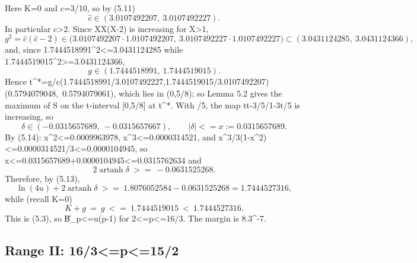 \documentclass[10pt,reqno]{amsart}
\def\({}\def\){}%
\def\frac#1#2{#1/#2}%
\def\ge{>=}\def\le{<=}%
\theoremstyle{definition}
\theoremstyle{remark}
\begin{document}
Here \(K=0\) and \(\hat c=\frac3{10}\), so by (5.11) \[\hat c\in(3.0107492207,\ 3.0107492227) .\] In particular \(\hat c>2\). Since \(X\mapsto X(X-2)\) is increasing for \(X>1\), \[g^2=\hat c(\hat c-2)\in\big(3.0107492207\cdot1.0107492207,\
3.0107492227\cdot1.0107492227\big)\subset(3.0431124285,\ 3.0431124366),\] and, since \(1.7444518991^2\le3.0431124285\) while \(1.7444519015^2\ge3.0431124366\), \[g\in(1.7444518991,\ 1.7444519015). \tag{5.15}\] Hence \(t^*=g/\hat c\in\big(\frac{1.7444518991}{3.0107492227},\frac{1.7444519015}{3.0107492207}\big)
\subset(0.5794079048,\ 0.5794079061)\), which lies in \((0,\frac58)\); so Lemma 5.2 gives the maximum of \(S\) on the \(t\)-interval \([0,\frac58]\) at \(t^*\). With \(\beta=\frac35\), the map \(t\mapsto\frac{t-3/5}{1-3t/5}\) is increasing, so \[\delta\in(-0.0315657689,\ -0.0315657667),\qquad |\delta|\le x:=0.0315657689 .\] By (5.14): \(x^2\le0.0009963978\), \(x^3\le0.0000314521\), and \(\frac{x^3}{3(1-x^2)}\le\frac{0.0000314521}{3}\le0.0000104945\), so \(x\le0.0315657689+0.0000104945\le0.0315762634\) and \[2\operatorname{artanh}\delta\ \ge\ -0.0631525268 .\] Therefore, by (5.13), \[\ln(4u)+2\operatorname{artanh}\delta\ \ge\ 1.8076052584-0.0631525268=1.7444527316 ,\] while (recall \(K=0\)) \[K+g\ =\ g\ \le\ 1.7444519015\ <\ 1.7444527316 .\] This is (5.3), so \(\|B\|_p\le u(p-1)\) for \(2\le p\le\frac{16}3\). The margin is \(8.3^{-7}\).

\subsection{Range II: \(\frac{16}{3}\le p\le\frac{15}{2}\)}\label{subsec:range2}
\end{document}
